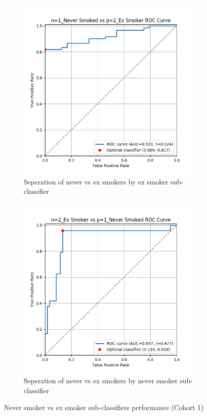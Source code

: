 \documentclass{article}
\begin{document}
\begin{figure}
    \begin{subfigure}{0.48\textwidth}
        \centering
        \includegraphics[width=\linewidth]{cohort1_1v2_roc.png}
        \caption{Seperation of never vs ex smokers by ex smoker sub-classifier}
    \end{subfigure}
    \hfill
    \begin{subfigure}{0.48\textwidth}
        \centering
        \includegraphics[width=\linewidth]{cohort1_2v1_roc.png}
        \caption{Seperation of never vs ex smokers by never smoker sub-classifier}
    \end{subfigure}
    \caption{Never smoker vs ex smoker sub-classifiers performance (Cohort 1)}
\end{figure}
\end{document}
